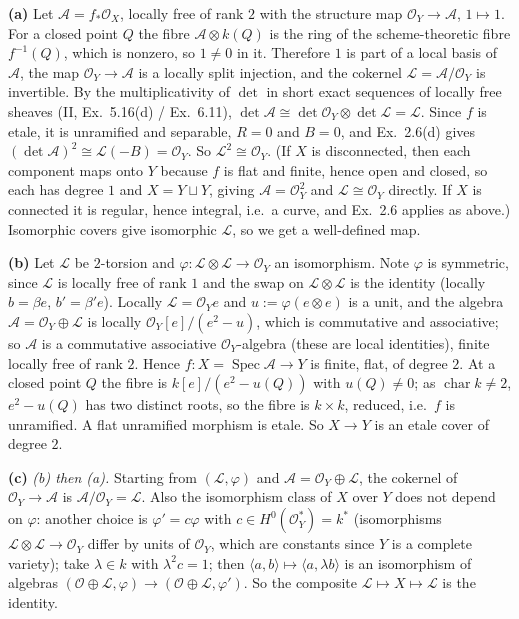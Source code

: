 \documentclass[11pt]{article}
\begin{document}
\textbf{(a)} Let $\mathcal A=f_*\mathcal O_X$, locally free of rank $2$ with the structure map $\mathcal O_Y\to\mathcal A$, $1\mapsto1$. For a closed point $Q$ the fibre $\mathcal A\otimes k(Q)$ is the ring of the scheme-theoretic fibre $f^{-1}(Q)$, which is nonzero, so $1\ne0$ in it. Therefore $1$ is part of a local basis of $\mathcal A$, the map $\mathcal O_Y\to\mathcal A$ is a locally split injection, and the cokernel $\mathcal L=\mathcal A/\mathcal O_Y$ is invertible. By the multiplicativity of $\det$ in short exact sequences of locally free sheaves (II, Ex.~5.16(d) / Ex.~6.11), $\det\mathcal A\cong\det\mathcal O_Y\otimes\det\mathcal L=\mathcal L$. Since $f$ is etale, it is unramified and separable, $R=0$ and $B=0$, and Ex.~2.6(d) gives $(\det\mathcal A)^2\cong\mathcal L(-B)=\mathcal O_Y$. So $\mathcal L^2\cong\mathcal O_Y$. (If $X$ is disconnected, then each component maps onto $Y$ because $f$ is flat and finite, hence open and closed, so each has degree $1$ and $X=Y\sqcup Y$, giving $\mathcal A=\mathcal O_Y^2$ and $\mathcal L\cong\mathcal O_Y$ directly. If $X$ is connected it is regular, hence integral, i.e.\ a curve, and Ex.~2.6 applies as above.) Isomorphic covers give isomorphic $\mathcal L$, so we get a well-defined map.

\textbf{(b)} Let $\mathcal L$ be $2$-torsion and $\varphi:\mathcal L\otimes\mathcal L\to\mathcal O_Y$ an isomorphism. Note $\varphi$ is symmetric, since $\mathcal L$ is locally free of rank $1$ and the swap on $\mathcal L\otimes\mathcal L$ is the identity (locally $b=\beta e$, $b'=\beta'e$). Locally $\mathcal L=\mathcal O_Ye$ and $u:=\varphi(e\otimes e)$ is a unit, and the algebra $\mathcal A=\mathcal O_Y\oplus\mathcal L$ is locally $\mathcal O_Y[e]/(e^2-u)$, which is commutative and associative; so $\mathcal A$ is a commutative associative $\mathcal O_Y$-algebra (these are local identities), finite locally free of rank $2$. Hence $f:X=\operatorname{Spec}\mathcal A\to Y$ is finite, flat, of degree $2$. At a closed point $Q$ the fibre is $k[e]/(e^2-u(Q))$ with $u(Q)\ne0$; as $\operatorname{char}k\ne2$, $e^2-u(Q)$ has two distinct roots, so the fibre is $k\times k$, reduced, i.e.\ $f$ is unramified. A flat unramified morphism is etale. So $X\to Y$ is an etale cover of degree $2$.

\textbf{(c)} \emph{(b) then (a).} Starting from $(\mathcal L,\varphi)$ and $\mathcal A=\mathcal O_Y\oplus\mathcal L$, the cokernel of $\mathcal O_Y\to\mathcal A$ is $\mathcal A/\mathcal O_Y=\mathcal L$. Also the isomorphism class of $X$ over $Y$ does not depend on $\varphi$: another choice is $\varphi'=c\varphi$ with $c\in H^0(\mathcal O_Y^*)=k^*$ (isomorphisms $\mathcal L\otimes\mathcal L\to\mathcal O_Y$ differ by units of $\mathcal O_Y$, which are constants since $Y$ is a complete variety); take $\lambda\in k$ with $\lambda^2c=1$; then $\langle a,b\rangle\mapsto\langle a,\lambda b\rangle$ is an isomorphism of algebras $(\mathcal O\oplus\mathcal L,\varphi)\to(\mathcal O\oplus\mathcal L,\varphi')$. So the composite $\mathcal L\mapsto X\mapsto\mathcal L$ is the identity.
\end{document}
